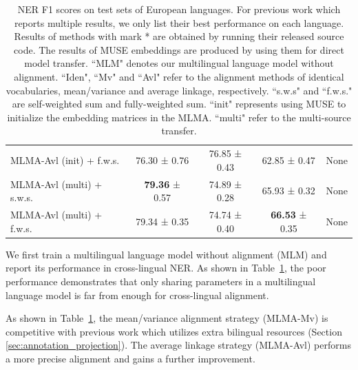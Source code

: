 \documentclass[11pt,a4paper]{article}
\begin{document}
\begin{table}[th]
\begin{tabular}{l c c c l}
			MLMA-Avl (init) + f.w.s. & 76.30 ± 0.76 & 76.85 ± 0.43 & 62.85 ± 0.47 & None\\
			MLMA-Avl (multi) + s.w.s. & \textbf{79.36} ± 0.57 & 74.89 ± 0.28 & 65.93 ± 0.32 & None\\
			MLMA-Avl (multi) + f.w.s. & 79.34 ± 0.35 & 74.74 ± 0.40 & \textbf{66.53} ± 0.35 & None\\
			\hline
		\end{tabular}
		\caption{ NER F1 scores on test sets of European languages. For previous work which reports multiple results, we only list their best performance on each language. Results of methods with mark * are obtained by running their released source code. The results of MUSE embeddings are produced by using them for direct model transfer. ``MLM" denotes our multilingual language model without alignment. ``Iden", ``Mv" and ``Avl" refer to the alignment methods of identical vocabularies, mean/variance and average linkage, respectively. ``s.w.s" and ``f.w.s." are self-weighted sum and fully-weighted sum. ``init" represents using MUSE to initialize the embedding matrices in the MLMA. ``multi" refer to the multi-source transfer.}
		\vspace{-1em}
		\label{table:NERmain}
	\end{table}
	
	We first train a multilingual language model without alignment (MLM) and report its performance in cross-lingual NER. As shown in Table~\ref{table:NERmain}, the poor performance demonstrates that only sharing parameters in a multilingual language model is far from enough for cross-lingual alignment.
	
	As shown in Table~\ref{table:NERmain}, the mean/variance alignment strategy (MLMA-Mv) is competitive with previous work which utilizes extra bilingual resources (Section \ref{sec:annotation_projection}). The average linkage strategy (MLMA-Avl) performs a more precise alignment and gains a further improvement.%
	
\end{document}
